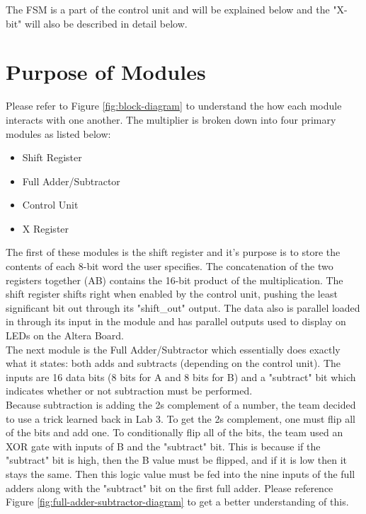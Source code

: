 \documentclass[journal, twocolumn, final,11pt,letterpaper]{IEEEtran}
\begin{document}
The FSM is a part of the control unit and will be explained below and the "X-bit" will also be described in detail below. 

\section{Purpose of Modules}
Please refer to Figure \ref{fig:block-diagram} to understand the how each module interacts with one another. The multiplier is broken down into four primary modules as listed below:
\begin{itemize}
	\item Shift Register 
	\item Full Adder/Subtractor
	\item Control Unit 
	\item X Register 
\end{itemize} 

The first of these modules is the shift register and it's purpose is to store the contents of each 8-bit word the user specifies. The concatenation of the two registers together (AB) contains the 16-bit product of the multiplication. The shift register shifts right when enabled by the control unit, pushing the least significant bit out through its "shift\_out" output. The data also is parallel loaded in through its input in the module and has parallel outputs used to display on LEDs on the Altera Board. \\

The next module is the Full Adder/Subtractor which essentially does exactly what it states: both adds and subtracts (depending on the control unit). The inputs are 16 data bits (8 bits for A and 8 bits for B) and a "subtract" bit which indicates whether or not subtraction must be performed.\\

Because subtraction is adding the 2s complement of a number, the team decided to use a trick learned back in Lab 3. To get the 2s complement, one must flip all of the bits and add one. To conditionally flip all of the bits, the team used an XOR gate with inputs of B and the "subtract" bit. This is because if the "subtract" bit is high, then the B value must be flipped, and if it is low then it stays the same. Then this logic value must be fed into the nine inputs of the full adders along with the "subtract" bit on the first full adder. Please reference Figure \ref{fig:full-adder-subtractor-diagram} to get a better understanding of this. \\
\end{document}
